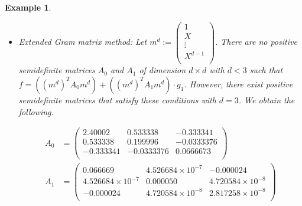 \documentclass[preprint,12pt,authoryear]{elsarticle}
\newtheorem{example}[theorem]{Example}
\newenvironment{example1}
  {\begin{example}\rm}
  {\end{example}}
\begin{document}
\begin{example1}
\begin{itemize}
    Hence, we obtain the certificates $X + 2 = s_2 + s_3 \cdot g_1$ where 

    \begin{itemize}
    \item $s_2 = f_1$
    \item $s_3 = \frac{1}{15}\frac{(X - (-1))^{2}}{(-2 - (-1))^{2}}\frac{(X -
        1)^{2}}{(-2 - 1)^{2}}\frac{(X - 3)^{2}}{(-2 - 3)^{2}}$
    \end{itemize}

    In expanded form, the degrees of the certificates are $\deg(s_2) = 10$ and
    $\deg(s_3) = 6$.

  \item Extended Gram matrix method: Let $m^{d} := \left(
      \begin{array}{c}
        1 \\
        X \\
        \vdots \\
        X^{d-1} \\
      \end{array}
    \right)$. There are no positive semidefinite matrices $A_0$ and $A_1$ of
    dimension $d \times d$ with $d < 3$ such that
    $f = ((m^{d})^{T} A_0 m^{d}) + ((m^{d})^{T} A_1 m^{d}) \cdot g_1$. However,
    there exist positive semidefinite matrices that satisfy these conditions with
    $d = 3$. We obtain the following.

    \begin{equation*} 
      \label{sec:comparison-with-an}
      \begin{split}
        A_0
        &= \left(
          \begin{array}{ccc}
            2.40002 & 0.533338 & -0.333341 \\
            0.533338 & 0.199996 & -0.0333376 \\
            -0.333341 & -0.0333376 & 0.0666673 \\
          \end{array}
          \right)\\
        A_1
        &= \left(
          \begin{array}{ccc}
            0.066669 & 4.526684 \times 10^{-7} & -0.000024 \\
            4.526684 \times 10^{-7} & 0.000050 & 4.720584 \times 10^{-8}\\
            -0.000024 & 4.720584 \times 10^{-8} & 2.817258 \times 10^{-8}\\
          \end{array}
          \right)
      \end{split}
    \end{equation*}


\end{itemize}
\end{example1}
\end{document}
